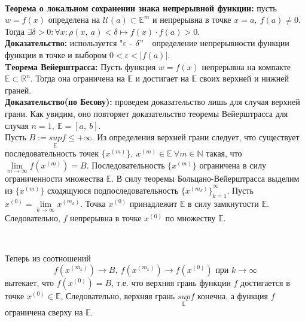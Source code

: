 \documentclass[a4paper,14pt]{extreport}
\begin{document}
\\[4mm]\textbf{Теорема о локальном сохранении знака непрерывной функции:} пусть $w = f(x)$ определена на $\mathscr{U}(a) \subset \mathbb{E}^m$ и непрерывна в точке $x = a,~ f(a) \neq 0.$
Тогда $\exists \delta > 0: \forall x: \rho(x,~ a) < \delta \mapsto f(x)\cdot f(a) > 0.$
\\[2mm]\textbf{Доказательство:} используется "$\varepsilon$ - $\delta"\quad$определение непрерывности функции
функции в точке и выбором $0 < \varepsilon < |f(a)|.$
\\[2mm]\textbf{Tеорема Вейерштрасса:} Пусть функция $w = f(x)$ непрерывна на
компакте $\mathbb{E} \subset \mathbb{R}^n.$ Тогда она ограничена на $\mathbb{E}$ и достигает на $\mathbb{E}$
своих верхней и нижней граней.
\\[2mm]\textbf{Доказательство(по Бесову):} проведем доказательство лишь для случая верхней грани. 
Как увидим, оно повторяет доказательство теоремы Вейерштрасса для случая $n = 1, ~ \mathbb{E} = [a, ~b]$.
\\[2mm]Пусть $B := {\underset{\mathbb{E}}{sup}} f \leq +\infty$. Из определения верхней грани следует, что существует
последовательность точек $\{x^{(m)}\}, ~x^{(m)} \in \mathbb{E} ~\forall m \in \mathbb{N}$ такая, что 
\\[2mm]$\lim\limits_{m \to \infty}f(x^{(m)}) = B$. Последовательность $\{x^{(m)}\}$ ограничена в силу ограниченности
множества $\mathbb{E}$. В силу теоремы Больцано-Вейерштрасса выделим из $\{x^{(m)}\}$ сходящуюся подпоследовательность 
${\{x^{(m_k)}\}}_{k = 1}^\infty$. Пусть $x^{(0)} = \lim\limits_{k \to \infty} x^{(m_k)}$. Точка $x^{(0)}$ принадлежит $\mathbb{E}$
в силу замкнутости $\mathbb{E}$. Следовательно, $f$ непрерывна в точке $x^{(0)}$ по множеству $\mathbb{E}$.

\

Теперь из соотношений 
$$f(x^{(m_k)}) \to B, ~ f(x^{(m_k)}) \to f(x^{(0)}) \text{ при } k \to \infty$$ вытекает, что $f(x^{(0)}) = B$, т.е. что верхняя
грань функции $f$ достигается в точке $x^{(0)} \in \mathbb{E}$, Следовательно, верхняя грань $\underset{\mathbb{E}}{sup}f$ конечна,
а функция $f$ ограничена сверху на $\mathbb{E}$.

\
\end{document}
